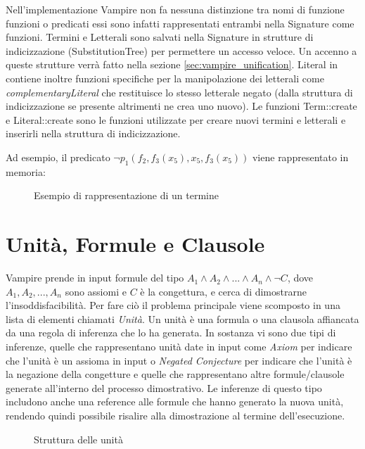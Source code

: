 \documentclass[./main.tex]{subfiles}
\begin{document}
Nell'implementazione Vampire non fa nessuna distinzione tra nomi di funzione funzioni o predicati essi sono infatti rappresentati
entrambi nella Signature come funzioni. 
Termini e Letterali sono salvati nella Signature in strutture di indicizzazione (SubstitutionTree) per permettere un accesso veloce.
Un accenno a queste strutture verrà fatto nella sezione \ref{sec:vampire_unification}.
Literal in contiene inoltre funzioni specifiche per la manipolazione dei letterali come \textit{complementaryLiteral} 
che restituisce lo stesso letterale negato (dalla struttura di indicizzazione se presente altrimenti ne crea uno nuovo).
Le funzioni Term::create e Literal::create sono le funzioni utilizzate per creare nuovi termini e letterali e inserirli nella struttura di indicizzazione.

Ad esempio, il predicato $\lnot p_1(f_2,f_3(x_5), x_5, f_3(x_5))$ viene rappresentato in memoria:

\begin{figure}[H]
    \centering
    \scalebox{0.55}{    
        
    }
    \caption{Esempio di rappresentazione di un termine}
    \label{fig:vampire_term_example}
\end{figure}




\section{Unità, Formule e Clausole} \label{sec:vampire_formula}
Vampire prende in input formule del tipo $A_1 \land A_2 \land ... \land A_n \land \lnot C$,
dove $A_1, A_2, ..., A_n$ sono assiomi e $C$ è la congettura,
e cerca di dimostrarne l'insoddisfacibilità.
Per fare ciò il problema principale viene scomposto in una lista di elementi chiamati \textit{Unità}.
Un unità è una formula o una clausola affiancata da una regola di inferenza che lo ha generata.
In sostanza vi sono due tipi di inferenze, quelle che rappresentano unità date in input
come \textit{Axiom} per indicare che l'unità è un assioma in input o
\textit{Negated Conjecture} per indicare che l'unità è la negazione della congetture
e quelle che rappresentano altre formule/clausole generate all'interno del processo dimostrativo.
Le inferenze di questo tipo includono anche una reference alle formule che hanno generato la nuova unità,
rendendo quindi possibile risalire alla dimostrazione al termine dell'esecuzione.


\begin{figure}[H]
    \centering
    \scalebox{0.55}{
        
    }
    \caption{Struttura delle unità}
    \label{fig:vampire_units}
\end{figure}
\end{document}
